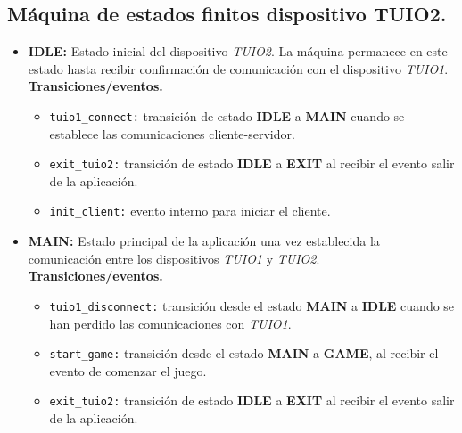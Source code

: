 \subsection{Máquina de estados finitos dispositivo TUIO2.}

\begin{itemize}
\item \textbf{IDLE:} Estado inicial del dispositivo \emph{TUIO2}. La máquina permanece en este estado hasta recibir confirmación de comunicación con el dispositivo \emph{TUIO1}.\\
\textbf{Transiciones/eventos.}
\begin{itemize}
\item \texttt{tuio1\_connect:} transición de estado \textbf{IDLE} a \textbf{MAIN} cuando se establece las comunicaciones cliente-servidor.
\item \texttt{exit\_tuio2:} transición de estado \textbf{IDLE} a \textbf{EXIT} al recibir el evento salir de la aplicación.
\item \texttt{init\_client:} evento interno para iniciar el cliente.
\end{itemize}


\item \textbf{MAIN:} Estado principal de la aplicación una vez establecida la comunicación entre los dispositivos \emph{TUIO1} y \emph{TUIO2}.\\
\textbf{Transiciones/eventos.}
\begin{itemize}
\item \texttt{tuio1\_disconnect:} transición desde el estado \textbf{MAIN} a \textbf{IDLE} cuando se han perdido las comunicaciones con \emph{TUIO1}.
\item \texttt{start\_game:} transición desde el estado \textbf{MAIN} a \textbf{GAME}, al recibir el evento de comenzar el juego.
\item \texttt{exit\_tuio2:} transición de estado \textbf{IDLE} a \textbf{EXIT} al recibir el evento salir de la aplicación.
\end{itemize}



\end{itemize}
